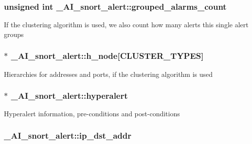 \hypertarget{struct__AI__snort__alert_a285aff12d6bac03c316ccc5305d28e53}{
\subsubsection[{grouped\_\-alarms\_\-count}]{\setlength{\rightskip}{0pt plus 5cm}unsigned int {\bf \_\-AI\_\-snort\_\-alert::grouped\_\-alarms\_\-count}}}
\label{struct__AI__snort__alert_a285aff12d6bac03c316ccc5305d28e53}
If the clustering algorithm is used, we also count how many alerts this single alert groups \hypertarget{struct__AI__snort__alert_ac53765584296ead1328eabfaba8a3aed}{
\subsubsection[{h\_\-node}]{$\ast$ {\bf \_\-AI\_\-snort\_\-alert::h\_\-node}\mbox{[}CLUSTER\_\-TYPES\mbox{]}}}
\label{struct__AI__snort__alert_ac53765584296ead1328eabfaba8a3aed}
Hierarchies for addresses and ports, if the clustering algorithm is used \hypertarget{struct__AI__snort__alert_ac101de15b4f9451f235b82122f77b62a}{
\subsubsection[{hyperalert}]{$\ast$ {\bf \_\-AI\_\-snort\_\-alert::hyperalert}}}
\label{struct__AI__snort__alert_ac101de15b4f9451f235b82122f77b62a}
Hyperalert information, pre-\/conditions and post-\/conditions \hypertarget{struct__AI__snort__alert_a754ca683593c838e4032fa8c13b1512b}{
\subsubsection[{ip\_\-dst\_\-addr}]{ {\bf \_\-AI\_\-snort\_\-alert::ip\_\-dst\_\-addr}}}
